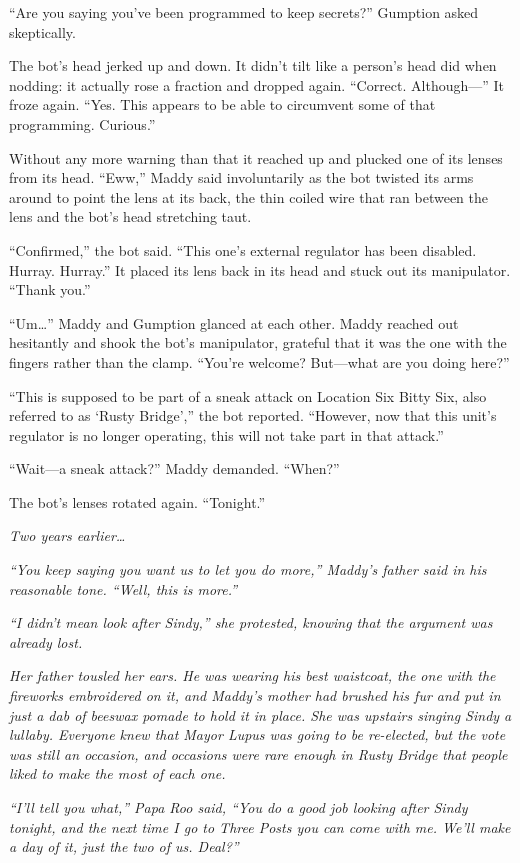 \documentclass[10pt]{article}
\begin{document}
``Are you saying you've been programmed to keep secrets?'' Gumption
asked skeptically.

The bot's head jerked up and down. It didn't tilt like a person's head
did when nodding: it actually rose a fraction and dropped again.
``Correct. Although---'' It froze again. ``Yes. This appears to be able
to circumvent some of that programming. Curious.''

Without any more warning than that it reached up and plucked one of its
lenses from its head. ``Eww,'' Maddy said involuntarily as the bot
twisted its arms around to point the lens at its back, the thin coiled
wire that ran between the lens and the bot's head stretching taut.

``Confirmed,'' the bot said. ``This one's external regulator has been
disabled. Hurray. Hurray.'' It placed its lens back in its head and
stuck out its manipulator. ``Thank you.''

``Um\ldots{}'' Maddy and Gumption glanced at each other. Maddy reached
out hesitantly and shook the bot's manipulator, grateful that it was the
one with the fingers rather than the clamp. ``You're welcome? But---what
are you doing here?''

``This is supposed to be part of a sneak attack on Location Six Bitty
Six, also referred to as `Rusty Bridge','' the bot reported. ``However,
now that this unit's regulator is no longer operating, this will not
take part in that attack.''

``Wait---a sneak attack?'' Maddy demanded. ``When?''

The bot's lenses rotated again. ``Tonight.''

\emph{Two years earlier\ldots{}}

\emph{``You keep saying you want us to let you do more,'' Maddy's father
said in his reasonable tone. ``Well, this is more.''}

\emph{``I didn't mean look after Sindy,'' she protested, knowing that
the argument was already lost.}

\emph{Her father tousled her ears. He was wearing his best waistcoat,
the one with the fireworks embroidered on it, and Maddy's mother had
brushed his fur and put in just a dab of beeswax pomade to hold it in
place. She was upstairs singing Sindy a lullaby. Everyone knew that
Mayor Lupus was going to be re-elected, but the vote was still an
occasion, and occasions were rare enough in Rusty Bridge that people
liked to make the most of each one.}

\emph{``I'll tell you what,'' Papa Roo said, ``You do a good job looking
after Sindy tonight, and the next time I go to Three Posts you can come
with me. We'll make a day of it, just the two of us. Deal?''}
\end{document}
